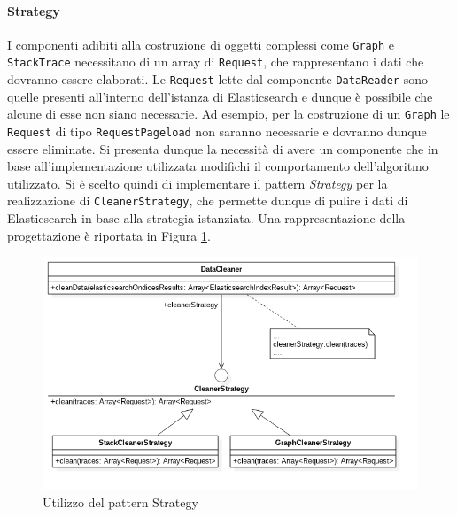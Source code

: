 \paragraph{Strategy} \Spazio
\label{sec:patternStrategy}
I componenti adibiti alla costruzione di oggetti complessi come \texttt{Graph} e \texttt{StackTrace} necessitano di un array di \texttt{Request}, che rappresentano i dati che dovranno essere elaborati. Le \texttt{Request} lette dal componente \texttt{DataReader} sono quelle presenti all'interno dell'istanza di Elasticsearch e dunque è possibile che alcune di esse non siano necessarie. Ad esempio, per la costruzione di un \texttt{Graph} le \texttt{Request} di tipo \texttt{RequestPageload} non saranno necessarie e dovranno dunque essere eliminate. Si presenta dunque la necessità di avere un componente che in base all'implementazione utilizzata modifichi il comportamento dell'algoritmo utilizzato. Si è scelto quindi di implementare il pattern \emph{Strategy} per la realizzazione di \texttt{CleanerStrategy}, che permette dunque di pulire i dati di Elasticsearch in base alla strategia istanziata. Una rappresentazione della progettazione è riportata in Figura \ref{img:strategy}.

\begin{figure}[H]
	\centering
	\includegraphics[width=1\textwidth]{Images/patternStrategy.png}
	\caption{Utilizzo del pattern Strategy}
	\label{img:strategy}
\end{figure}
 
